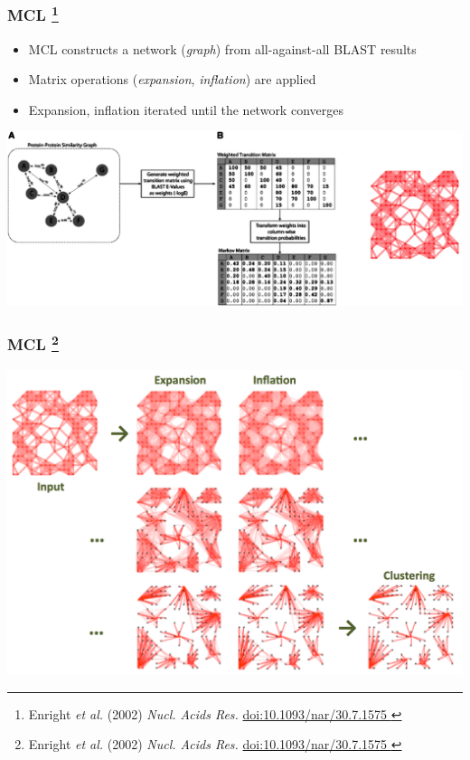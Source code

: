 
% 
\begin{frame}
  \frametitle{MCL
    \footnote{\tiny{Enright \textit{et al.} (2002) \textit{Nucl. Acids Res.} \href{http://dx.doi.org/10.1093/nar/30.7.1575}{doi:10.1093/nar/30.7.1575
    }}}
  }
  \begin{itemize}
    \item MCL constructs a network (\textit{graph}) from all-against-all BLAST results
    \item \textcolor{hutton_green}{Matrix operations (\textit{expansion}, \textit{inflation}) are applied}
    \item \textcolor{hutton_blue}{Expansion, inflation iterated until the network converges}
  \end{itemize}
  \begin{center}
      \includegraphics[width=1\textwidth]{images/mcl_intro}
  \end{center}
\end{frame}

% 
\begin{frame}
  \frametitle{MCL
    \footnote{\tiny{Enright \textit{et al.} (2002) \textit{Nucl. Acids Res.} \href{http://dx.doi.org/10.1093/nar/30.7.1575}{doi:10.1093/nar/30.7.1575
    }}}
  }  
  \begin{center}
      \includegraphics[width=1\textwidth]{images/mcl_method}
  \end{center}
\end{frame}

